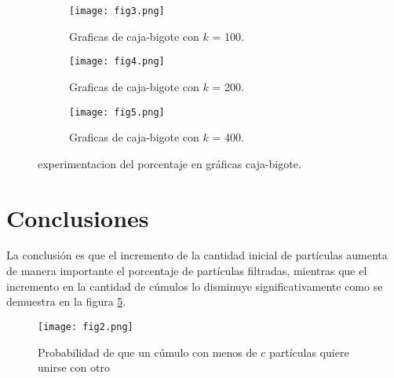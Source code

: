 \documentclass{article}
\begin{document}
\begin{figure} [h!]
 	\centering
 	\begin{subfigure}[b]{0.40\linewidth}
 		\texttt{[image: fig3.png]}
 		 \caption{Graficas de caja-bigote con $k$ = 100.}
 		\label{3d}
 	\end{subfigure}
 	\begin{subfigure}[b]{0.40\linewidth}
 		\texttt{[image: fig4.png]}
 		 \caption{Graficas de caja-bigote con $k$ = 200.}
 		\label{levelplot}
 	\end{subfigure}
 	 	\begin{subfigure}[b]{0.40\linewidth}
 		\texttt{[image: fig5.png]}
 		 \caption{Graficas de caja-bigote con $k$ = 400.}
 		\label{levelplot}
 	\end{subfigure}
 	
 	\caption{experimentacion del porcentaje en gráficas caja-bigote.}  	
\label{fig2}
 \end{figure}
 
\section{Conclusiones} 

La conclusión es que el incremento de la cantidad inicial de partículas aumenta de manera importante el porcentaje de partículas filtradas, mientras que el incremento en la cantidad de cúmulos lo disminuye significativamente como se demuestra en la figura \ref{fig3}.

\begin{figure} [ht]%
    \centering
    \texttt{[image: fig2.png]} %
    \caption{Probabilidad de que un cúmulo con menos de $c$ partículas quiere unirse con otro }
    \label{fig3}
\end{figure}



\end{document}
